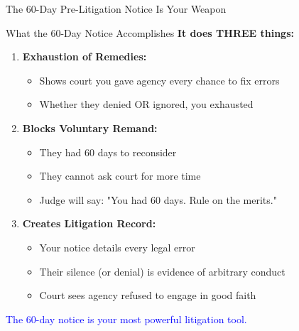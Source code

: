 \documentclass[11pt]{beamer}
\begin{document}
	\begin{frame}{The 60-Day Pre-Litigation Notice Is Your Weapon}
		\scriptsize
		\begin{block}{What the 60-Day Notice Accomplishes}
			\textbf{It does THREE things:}
			\vspace{0.2cm}
			\begin{enumerate}
				\item \textbf{Exhaustion of Remedies:}
				\begin{itemize}
					\item Shows court you gave agency every chance to fix errors
					\item Whether they denied OR ignored, you exhausted
				\end{itemize}
				\item \textbf{Blocks Voluntary Remand:}
				\begin{itemize}
					\item They had 60 days to reconsider
					\item They cannot ask court for more time
					\item Judge will say: "You had 60 days. Rule on the merits."
				\end{itemize}
				\item \textbf{Creates Litigation Record:}
				\begin{itemize}
					\item Your notice details every legal error
					\item Their silence (or denial) is evidence of arbitrary conduct
					\item Court sees agency refused to engage in good faith
				\end{itemize}
			\end{enumerate}
			\textcolor{blue}{The 60-day notice is your most powerful litigation tool.}
		\end{block}
	\end{frame}
	
\end{document}
